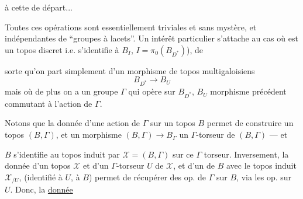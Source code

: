  à cette  de départ...


Toutes ces opérations sont essentiellement
triviales et sans mystère, et indépendantes de
   ``groupes à
lacets''. Un intérêt particulier s'attache
au cas où  est un topos discret i.e.
s'identifie à $B_I$,  $I=\pi_0(B_{D^*})$), de


sorte qu'on part simplement d'un morphisme
de topos multigaloisiens
\[
 B_{D^*}\longrightarrow B_U
\]
mais où de plus on a un groupe $\Gamma$
qui opère sur $B_{D^*}$, $B_U$  morphisme
précédent commutant à l'action de $\Gamma$.

Notons que la donnée d'une action
de $\Gamma$ sur un topos $B$ permet de
construire un topos $(B,\Gamma)$, et
un morphisme $(B,\Gamma)\longrightarrow B_\Gamma$
 un $\Gamma$-torseur de $(B,\Gamma)$ --- et

$B$ s'identifie au topos induit par
$\mathcal X=(B,\Gamma)$ sur ce $\Gamma$ torseur. Inversement,
la donnée d'un topos $\mathcal X$ et d'un
$\Gamma$-torseur $U$ de $\mathcal X$, et d'un
 de $B$ avec le topos induit
$\mathcal X_{/U}$,  (identifié à $U$,  à $B$) permet
de récupérer des op. de $\Gamma$ sur $B$,
via les op. sur $U$. Donc, la \uline{donnée}


